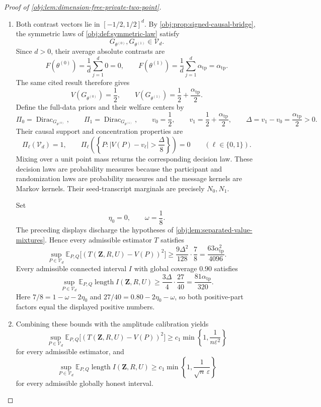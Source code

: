 \documentclass[11pt]{article}
\begin{document}
\begin{proof}[Proof of \cref{obj:lem:dimension-free-private-two-point}]
\begin{enumerate}
\item Both contrast vectors lie in \([-1/2,1/2]^d\). By
\cref{obj:prop:signed-causal-bridge}, the symmetric laws of
\cref{obj:def:symmetric-law} satisfy
\[
G_{\theta^{(0)}},G_{\theta^{(1)}}\in\mathcal V_d.
\]
Since \(d>0\), their average absolute contrasts are
\[
F(\theta^{(0)})=\frac1d\sum_{j=1}^d0=0,
\qquad
F(\theta^{(1)})
=\frac1d\sum_{j=1}^d\alpha_{\mathrm{tp}}
=\alpha_{\mathrm{tp}}.
\]
The same cited result therefore gives
\[
V(G_{\theta^{(0)}})=\frac12,
\qquad
V(G_{\theta^{(1)}})=\frac12+\frac{\alpha_{\mathrm{tp}}}{2}.
\]
Define the full-data priors and their welfare centers by
\[
\Pi_0=\operatorname{Dirac}_{G_{\theta^{(0)}}},
\qquad
\Pi_1=\operatorname{Dirac}_{G_{\theta^{(1)}}},
\qquad
v_0=\frac12,
\qquad
v_1=\frac12+\frac{\alpha_{\mathrm{tp}}}{2},
\qquad
\Delta=v_1-v_0=\frac{\alpha_{\mathrm{tp}}}{2}>0.
\]
Their causal support and concentration properties are
\[
\Pi_\ell(\mathcal V_d)=1,
\qquad
\Pi_\ell\left(\left\{P:
|V(P)-v_\ell|>\frac{\Delta}{8}\right\}\right)=0
\qquad(\ell\in\{0,1\}).
\]
Mixing over a unit point mass returns the corresponding decision law. These decision laws are probability measures because the participant and randomization laws are probability measures and the message kernels are Markov kernels. Their seed-transcript marginals are precisely \(N_0,N_1\).

Set
\[
\eta_0=0,\qquad \omega=\frac18.
\]
The preceding displays discharge the hypotheses of
\cref{obj:lem:separated-value-mixtures}. Hence every admissible estimator \(T\) satisfies
\[
\sup_{P\in\mathcal V_d}
\mathbb E_{P,Q}\bigl[(T(\mathbf Z,R,U)-V(P))^2\bigr]
\ge
\frac{9\Delta^2}{128}\cdot\frac78
=
\frac{63\alpha_{\mathrm{tp}}^2}{4096}.
\]
Every admissible connected interval \(I\) with global coverage \(0.90\) satisfies
\[
\sup_{P\in\mathcal V_d}
\mathbb E_{P,Q}\operatorname{length}I(\mathbf Z,R,U)
\ge
\frac{3\Delta}{4}\cdot\frac{27}{40}
=
\frac{81\alpha_{\mathrm{tp}}}{320}.
\]
Here \(7/8=1-\omega-2\eta_0\) and
\(27/40=0.80-2\eta_0-\omega\), so both positive-part factors equal the displayed positive numbers.

\item Combining these bounds with the amplitude calibration yields
\[
\sup_{P\in\mathcal V_d}
\mathbb E_{P,Q}\bigl[(T(\mathbf Z,R,U)-V(P))^2\bigr]
\ge
c_1\min\left\{1,\frac1{n\varepsilon^2}\right\}
\]
for every admissible estimator, and
\[
\sup_{P\in\mathcal V_d}
\mathbb E_{P,Q}\operatorname{length}I(\mathbf Z,R,U)
\ge
c_1\min\left\{1,\frac1{\sqrt n\,\varepsilon}\right\}
\]
for every admissible globally honest interval.


\end{enumerate}
\end{proof}
\end{document}

